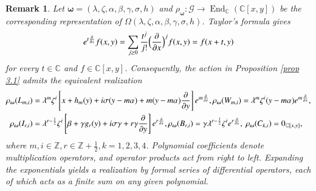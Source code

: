 \documentclass[12pt,reqno]{amsart}
\def\C{\mathbb{C}}
\numberwithin{equation}{section}
\newtheorem{rema}[theo]{Remark}
\begin{document}
\begin{rema}\label{rema3.2}
Let $\boldsymbol{\omega}=(\lambda, \zeta, \alpha,\beta,\gamma,\sigma,h)$ and $\rho_{\boldsymbol{\omega}}:\mathcal G\to\operatorname{End}_{\mathbb C}(\C[x,y])$ be the corresponding representation of $\Omega(\lambda, \zeta, \alpha,\beta,\gamma,\sigma,h)$. Taylor’s formula gives
\begin{equation}\label{Taylor's formula}
\aligned
e^{t\frac{\partial}{\partial{x}}}f(x,y)
=
\sum_{j\ge0}
\frac{t^j}{j!}\Big(\frac{\partial}{\partial{x}}\Big)^jf(x,y)
=f(x+t,y)
\endaligned
\end{equation}
for every $t\in\mathbb C$ and $f\in \C[x,y]$. 
Consequently, the action in Proposition \ref{prop 3.1} admits the equivalent realization
\begin{equation*}\label{act. def 3.1.2}
\aligned
\rho_{\boldsymbol{\omega}}(L_{m,i})
&=\lambda^m\zeta^i
\left[
x+h_m(y)+i\sigma(y-m\alpha)
+m(y-m\alpha)\frac{\partial}{\partial{y}}
\right]e^{m\frac{\partial}{\partial{x}}},
\rho_{\boldsymbol{\omega}}(W_{m,i})
=\lambda^m\zeta^i(y-m\alpha)e^{m\frac{\partial}{\partial{x}}},\\
\rho_{\boldsymbol{\omega}}(I_{r,i})
&=\lambda^{r-\frac12}\zeta^i
\left[
\beta+\gamma g_r(y)+i\sigma\gamma
+r\gamma\frac{\partial}{\partial{y}}
\right]e^{r\frac{\partial}{\partial{x}}},
\rho_{\boldsymbol{\omega}}(B_{r,i})
=\gamma\lambda^{r-\frac12}\zeta^i e^{r\frac{\partial}{\partial{x}}},\
\rho_{\boldsymbol{\omega}}(C_{k,i})=0_{\C[x,y]},
\endaligned
\end{equation*}
where $m,i\in\mathbb Z, r\in\mathbb Z+\frac12, k=1,2,3,4$.
Polynomial coefficients denote multiplication operators, and operator products act from right to left. Expanding the exponentials yields a realization by formal series of differential operators, each of which acts as a finite sum on any given polynomial.




    
\end{rema}
\end{document}

